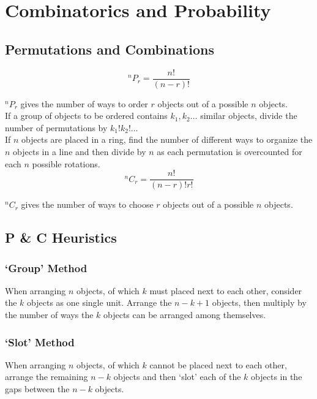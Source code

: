 \documentclass[../main]{subfiles}
\begin{document}
\section{Combinatorics and Probability}

	\subsection{Permutations and Combinations}

	\[ ^nP_r = \frac{n!}{(n-r)!} \]

	\(^nP_r\) gives the number of ways to order \(r\) objects out of a possible \(n\) objects. \\

	If a group of objects to be ordered contains \(k_1, k_2 \dots \) similar objects, divide the number of permutations by \(k_1! k_2! \dots\) \\

	If \(n\) objects are placed in a ring, find the number of different ways to organize the \(n\) objects in a line and then divide by \(n\) as each permutation is overcounted for each \(n\) possible rotations. \\

	\[ ^nC_r = \frac{n!}{(n-r)! r!} \]

	\(^nC_r\) gives the number of ways to choose \(r\) objects out of a possible \(n\) objects. \\

	\subsection{P \& C Heuristics}

	\subsubsection{`Group' Method}

	When arranging \(n\) objects, of which \(k\) must placed next to each other, consider the \(k\) objects as one single unit. Arrange the \(n-k+1\) objects, then multiply by the number of ways the \(k\) objects can be arranged among themselves. \\

	\subsubsection{`Slot' Method}

	When arranging \(n\) objects, of which \(k\) cannot be placed next to each other, arrange the remaining \(n-k\) objects and then `slot' each of the \(k\) objects in the gaps between the \(n-k\) objects. \\
\end{document}
